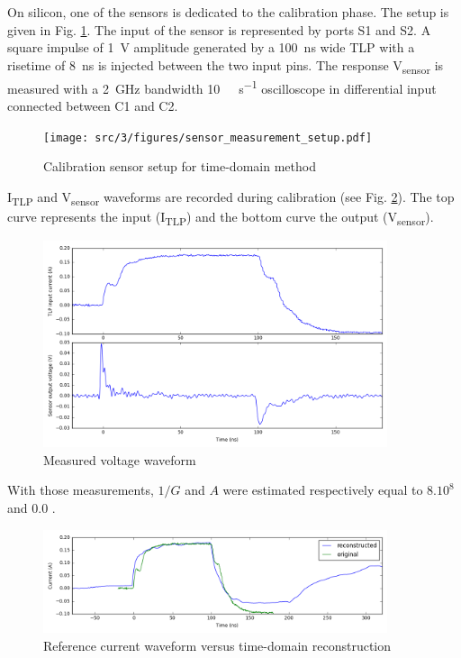 On silicon, one of the sensors is dedicated to the calibration phase.
The setup is given in Fig. \ref{fig:calibration-sensor}.
The input of the sensor is represented by ports S1 and S2.
A square impulse of \SI{1}{\volt} amplitude generated by a \SI{100}{\nano\second} wide TLP with a risetime of \SI{8}{\nano\second} is injected between the two input pins.
The response V\textsubscript{sensor} is measured with a \SI{2}{\giga\hertz} bandwidth \SI{10}{\giga\sample\per\second} oscilloscope in differential input connected between C1 and C2.

\begin{figure}[!h]
  \centering
  \texttt{[image: src/3/figures/sensor\_measurement\_setup.pdf]}
  \caption{Calibration sensor setup for time-domain method}
  \label{fig:calibration-sensor}
\end{figure}

I\textsubscript{TLP} and V\textsubscript{sensor} waveforms are recorded during calibration (see Fig. \ref{fig:measurement-nfs}).
The top curve represents the input (I\textsubscript{TLP}) and the bottom curve the output (V\textsubscript{sensor}).

\begin{figure}[!h]
  \centering
  \includegraphics[width=0.9\textwidth]{src/3/figures/measured_waveform.png}
  \caption{Measured voltage waveform}
  \label{fig:measurement-nfs}
\end{figure}

With those measurements, $1/G$ and $A$ were estimated respectively equal to $8.10^8$ and $0.0$ .

\begin{figure}[!h]
  \centering
  \includegraphics[width=0.9\textwidth]{src/3/figures/time_domain_vs_ref.png}
  \caption{Reference current waveform versus time-domain reconstruction}
  \label{fig:time-domain-reconstructed}
\end{figure}

